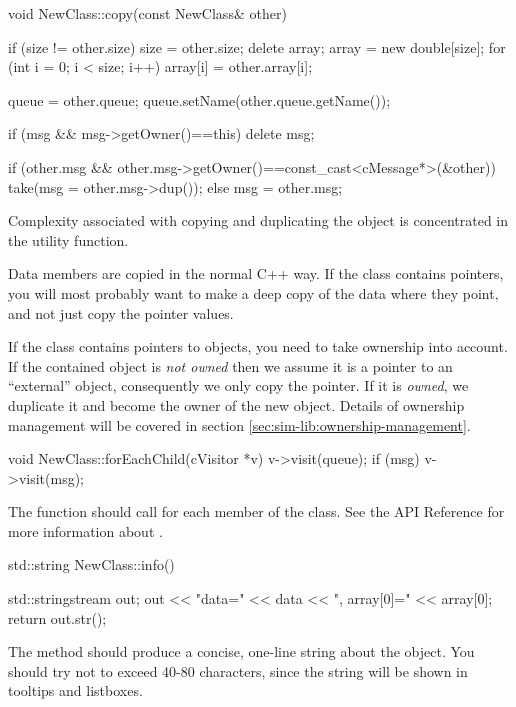\begin{cpp}
void NewClass::copy(const NewClass& other)
{
    if (size != other.size) {
        size = other.size;
        delete array;
        array = new double[size];
    }
    for (int i = 0; i < size; i++)
        array[i] = other.array[i];

    queue = other.queue;
    queue.setName(other.queue.getName());

    if (msg && msg->getOwner()==this)
        delete msg;

    if (other.msg && other.msg->getOwner()==const_cast<cMessage*>(&other))
        take(msg = other.msg->dup());
    else
        msg = other.msg;
}
\end{cpp}

Complexity associated with copying and duplicating the object
is concentrated in the  utility function.

Data members are copied in the normal C++ way. If the class
contains pointers, you will most probably want to make a deep copy of
the data where they point, and not just copy the pointer values.

If the class contains pointers to {\opp} objects, you need
to take ownership into account. If the contained object is \textit{not owned}
then we assume it is a pointer to an ``external'' object, consequently
we only copy the pointer. If it is \textit{owned}, we duplicate
it and become the owner of the new object. Details of ownership
management will be covered in section \ref{sec:sim-lib:ownership-management}.


\begin{cpp}
void NewClass::forEachChild(cVisitor *v)
{
    v->visit(queue);
    if (msg)
        v->visit(msg);
}
\end{cpp}

The  function should call 
for each  member of the class. See the API Reference for more
information about .

\begin{cpp}
std::string NewClass::info()
{
    std::stringstream out;
    out << "data=" << data << ", array[0]=" << array[0];
    return out.str();

}
\end{cpp}

The  method should produce a concise, one-line string
about the object. You should try not to exceed 40-80 characters, since the
string will be shown in tooltips and listboxes.

